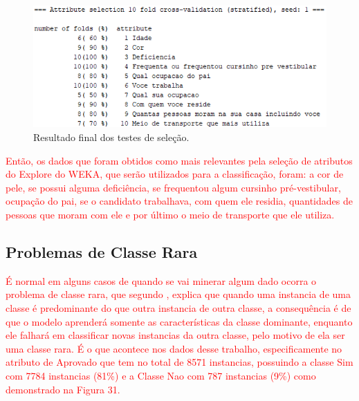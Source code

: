 \par
\begin{figure}[!htp]
	\begin{center}
    \caption{\label{fig:waveform_fig} Resultado final dos testes de seleção.}
	\includegraphics[scale=0.99]{Figuras/10_atributos.png}
	\end{center}
\end{figure}

\par
\textcolor{red}{Então, os dados que foram obtidos como mais relevantes pela seleção de atributos do Explore do WEKA, que serão utilizados para a classificação, foram: a cor de pele, se possui alguma deficiência, se frequentou algum cursinho pré-vestibular, ocupação do pai, se o candidato trabalhava, com quem ele residia, quantidades de pessoas que moram com ele e por último o meio de transporte que ele utiliza.}

\subsection{Problemas de Classe Rara}

\par
\textcolor{red}{É normal em alguns casos de quando se vai minerar algum dado ocorra o problema de classe rara, que segundo , explica que quando uma instancia de uma classe é predominante do que outra instancia de outra classe, a consequência é de que o modelo aprenderá somente as características da classe dominante, enquanto ele falhará em classificar novas instancias da outra classe, pelo motivo de ela ser uma classe rara. É o que acontece nos dados desse trabalho, especificamente no atributo de Aprovado que tem no total de 8571 instancias, possuindo a classe Sim com 7784 instancias (81\%) e a Classe Nao com 787 instancias (9\%) como demonstrado na Figura 31.}

